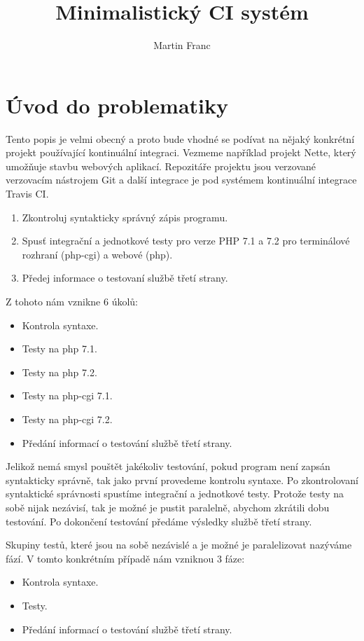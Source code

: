 \documentclass[thesis=B,czech]{template/FITthesisXE}
\title{Minimalistický CI systém}
\author{Martin Franc}
\begin{document}

\chapter{Úvod do problematiky}

Tento popis je velmi obecný a proto bude vhodné se podívat na nějaký konkrétní projekt používající kontinuální integraci.
Vezmeme například projekt Nette, který umožňuje stavbu webových aplikací.
Repozitáře projektu jsou verzované verzovacím nástrojem Git a další integrace je pod systémem kontinuální integrace Travis CI.

\begin{enumerate}
	\item Zkontroluj syntakticky správný zápis programu.
	\item Spusť integrační a jednotkové testy pro verze PHP 7.1 a 7.2 pro terminálové rozhraní (php-cgi) a webové (php).
	\item Předej informace o testovaní službě třetí strany.
\end{enumerate}

Z tohoto nám vznikne 6 úkolů:

\begin{itemize}
	\item Kontrola syntaxe.
	\item Testy na php 7.1.
	\item Testy na php 7.2.
	\item Testy na php-cgi 7.1.
	\item Testy na php-cgi 7.2.
	\item Předání informací o testování službě třetí strany.
\end{itemize}

Jelikož nemá smysl pouštět jakékoliv testování, pokud program není zapsán syntakticky správně, tak jako první provedeme kontrolu syntaxe.
Po zkontrolovaní syntaktické správnosti spustíme integrační a jednotkové testy.
Protože testy na sobě nijak nezávisí, tak je možné je pustit paralelně, abychom zkrátili dobu testování.
Po dokončení testování předáme výsledky službě třetí strany.

Skupiny testů, které jsou na sobě nezávislé a je možné je paralelizovat nazýváme fází.
V tomto konkrétním případě nám vzniknou 3 fáze:

\begin{itemize}
	\item Kontrola syntaxe.
	\item Testy.
	\item Předání informací o testování službě třetí strany.
\end{itemize}
\end{document}
